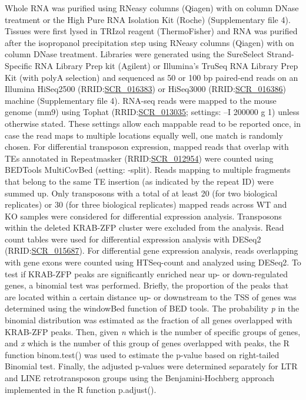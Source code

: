 \documentclass[11pt,a4paper]{article}
\begin{document}
Whole RNA was purified using RNeasy columns (Qiagen) with on column DNase treatment or the High Pure RNA Isolation Kit (Roche) (Supplementary file 4). Tissues were first lysed in TRIzol reagent (ThermoFisher) and RNA was purified after the isopropanol precipitation step using RNeasy columns (Qiagen) with on column DNase treatment. Libraries were generated using the SureSelect Strand-Specific RNA Library Prep kit (Agilent) or Illumina’s TruSeq RNA Library Prep Kit (with polyA selection) and sequenced as 50 or 100 bp paired-end reads on an Illumina HiSeq2500 (RRID:\href{https://scicrunch.org/resolver/SCR\_016383}{SCR\_016383}) or HiSeq3000 (RRID:\href{https://scicrunch.org/resolver/SCR\_016386}{SCR\_016386}) machine (Supplementary file 4). RNA-seq reads were mapped to the mouse genome (mm9) using Tophat (RRID:\href{https://scicrunch.org/resolver/SCR\_013035}{SCR\_013035}; settings: --I 200000 g 1) unless otherwise stated. These settings allow each mappable read to be reported once, in case the read maps to multiple locations equally well, one match is randomly chosen. For differential transposon expression, mapped reads that overlap with TEs annotated in Repeatmasker (RRID:\href{https://scicrunch.org/resolver/SCR\_012954}{SCR\_012954}) were counted using BEDTools MultiCovBed (setting: -split). Reads mapping to multiple fragments that belong to the same TE insertion (as indicated by the repeat ID) were summed up. Only transposons with a total of at least 20 (for two biological replicates) or 30 (for three biological replicates) mapped reads across WT and KO samples were considered for differential expression analysis. Transposons within the deleted KRAB-ZFP cluster were excluded from the analysis. Read count tables were used for differential expression analysis with DESeq2 (RRID:\href{https://scicrunch.org/resolver/SCR\_015687}{SCR\_015687}). For differential gene expression analysis, reads overlapping with gene exons were counted using HTSeq-count and analyzed using DESeq2. To test if KRAB-ZFP peaks are significantly enriched near up- or down-regulated genes, a binomial test was performed. Briefly, the proportion of the peaks that are located within a certain distance up- or downstream to the TSS of genes was determined using the windowBed function of BED tools. The probability \textit{p} in the binomial distribution was estimated as the fraction of all genes overlapped with KRAB-ZFP peaks. Then, given \textit{n} which is the number of specific groups of genes, and \textit{x} which is the number of this group of genes overlapped with peaks, the R function binom.test() was used to estimate the p-value based on right-tailed Binomial test. Finally, the adjusted p-values were determined separately for LTR and LINE retrotransposon groups using the Benjamini-Hochberg approach implemented in the R function p.adjust().
\end{document}
